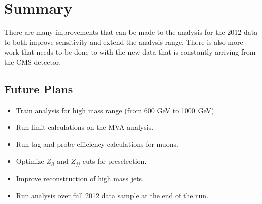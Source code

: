 %
%

\section{Summary}

There are many improvements that can be made to the analysis for the 2012 data to both improve sensitivity and extend the analysis range. There is also more work that needs to be done to with the new data that is constantly arriving from the CMS detector.


\subsection{Future Plans}

\begin{itemize}
\item
  Train analysis for high mass range (from 600 GeV to 1000 GeV).
\item
  Run limit calculations on the MVA analysis.
\item
  Run tag and probe efficiency calculations for muons.
\item
  Optimize $Z_{ll}$ and $Z_{jj}$ cuts for preselection.
\item
  Improve reconstruction of high mass jets.
\item
  Run analysis over full 2012 data sample at the end of the run.
\end{itemize}
 
